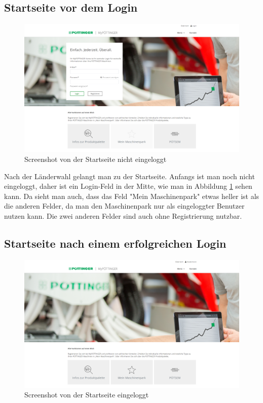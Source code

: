 \subsection{Startseite vor dem Login}
\begin{figure}[H]
	\centerline{
		\includegraphics[width=1\textwidth, frame]{./grafiken/erm_home_not_logged_in_1.png}
	}
	\vskip0pt
	\caption{Screenshot von der Startseite nicht eingeloggt} \label{fig:homeNotLoggedIn}
\end{figure}

Nach der Länderwahl gelangt man zu der Startseite. Anfangs ist man noch nicht eingeloggt, daher ist ein Login-Feld in der Mitte, wie man in Abbildung \ref{fig:homeNotLoggedIn} sehen kann. Da sieht man auch, dass das Feld "Mein Maschinenpark" etwas heller ist als die anderen Felder, da man den Maschinenpark nur als eingeloggter Benutzer nutzen kann. Die zwei anderen Felder sind auch ohne Registrierung nutzbar.
 
\subsection{Startseite nach einem erfolgreichen Login}
\begin{figure}[H]
	\centerline{
		\includegraphics[width=1\textwidth, frame]{./grafiken/erm_home_logged_in.png}
	}
	\vskip0pt
	\caption{Screenshot von der Startseite eingeloggt} \label{fig:homeLoggedIn}
\end{figure}

